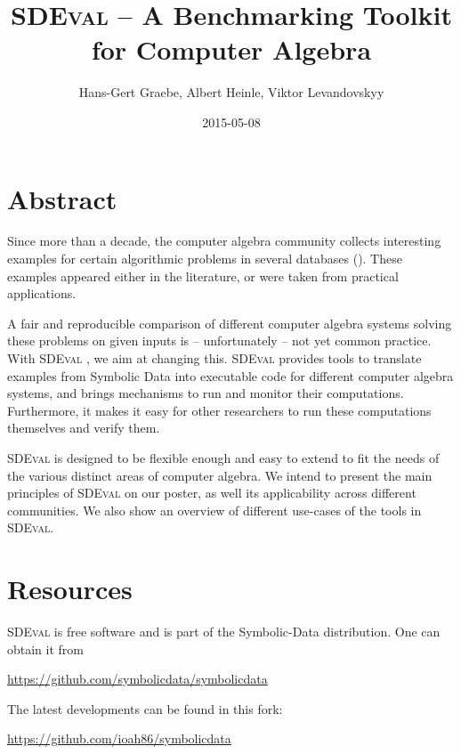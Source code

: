 \documentclass[11pt]{article}
\title{\textsc{SDEval} -- A Benchmarking Toolkit for Computer Algebra}
\author{Hans-Gert Graebe, Albert Heinle, Viktor Levandovskyy}
\date{2015-05-08}
\begin{document}
\maketitle

\setcounter{tocdepth}{3}

\section{Abstract}
\label{sec-1}

Since more than a decade, the computer algebra community 
collects interesting examples for certain algorithmic problems in several
databases (\cite{grabe2006symbolicdata,grabe2013symbolicdata,polyDB_paffenholz}). These examples appeared either in
the literature, or were taken from practical applications.

A fair and reproducible comparison of different computer
algebra systems solving these problems on given inputs is --
unfortunately -- not yet common practice.
With \textsc{SDEval} \cite{HeinleLev2015}, we aim at changing this. \textsc{SDEval} provides tools to translate
examples from Symbolic Data into executable code for different computer algebra
systems, and brings mechanisms to run and monitor
their computations. Furthermore, it makes it easy for other researchers to
run these computations themselves and verify them.

\textsc{SDEval} is designed to be flexible enough and easy to extend to fit the
needs of the various distinct areas of computer algebra. We intend to
present the main principles of \textsc{SDEval} on our poster, as well its
applicability across different communities. We also show an overview
of different use-cases of the tools in \textsc{SDEval}.

\section{Resources}
\label{sec-2}


\textsc{SDEval} is free software and is part of the Symbolic-Data
distribution. One can obtain it from
\begin{center}
\href{https://github.com/symbolicdata/symbolicdata}{https://github.com/symbolicdata/symbolicdata}
\end{center}
The latest developments can be found in this fork:
\begin{center}
\href{https://github.com/ioah86/symbolicdata}{https://github.com/ioah86/symbolicdata}
\end{center}
\end{document}
